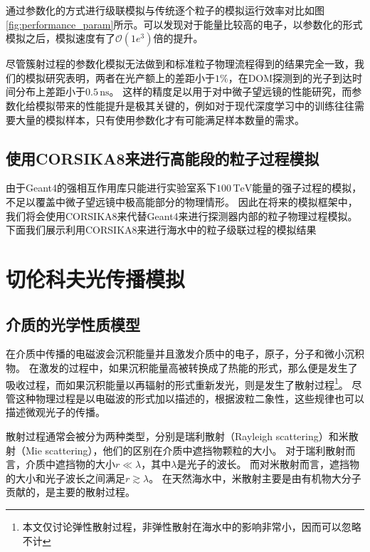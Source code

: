 通过参数化的方式进行级联模拟与传统逐个粒子的模拟运行效率对比如图\ref{fig:performance_param}所示。可以发现对于能量比较高的电子，以参数化的形式模拟之后，模拟速度有了$\mathcal{O}(1e^3)$倍的提升。

尽管簇射过程的参数化模拟无法做到和标准粒子物理流程得到的结果完全一致，我们的模拟研究表明，两者在光产额上的差距小于$1\%$，在DOM探测到的光子到达时间分布上差距小于$0.5\,\mathrm{ns}$。
这样的精度足以用于对中微子望远镜的性能研究，而参数化给模拟带来的性能提升是极其关键的，例如对于现代深度学习中的训练往往需要大量的模拟样本，只有使用参数化才有可能满足样本数量的需求。


\subsection{使用CORSIKA8来进行高能段的粒子过程模拟}

由于\textsf{Geant4}的强相互作用库只能进行实验室系下$100\,\mathrm{TeV}$能量的强子过程的模拟，不足以覆盖中微子望远镜中极高能部分的物理情形。
因此在将来的模拟框架中，我们将会使用\textsf{CORSIKA8}来代替\textsf{Geant4}来进行探测器内部的粒子物理过程模拟。
下面我们展示利用\textsf{CORSIKA8}来进行海水中的粒子级联过程的模拟结果


\section{切伦科夫光传播模拟}

\subsection{介质的光学性质模型}
\label{subsec:optical_model}

在介质中传播的电磁波会沉积能量并且激发介质中的电子，原子，分子和微小沉积物\cite{book_for_optical:1998}。
在激发的过程中，如果沉积能量高被转换成了热能的形式，那么便是发生了吸收过程，而如果沉积能量以再辐射的形式重新发光，则是发生了散射过程\footnote{本文仅讨论弹性散射过程，非弹性散射在海水中的影响非常小，因而可以忽略不计\cite{inelastic_scattering:2003}}。
尽管这种物理过程是以电磁波的形式加以描述的，根据波粒二象性，这些规律也可以描述微观光子的传播。

散射过程通常会被分为两种类型，分别是瑞利散射（Rayleigh scattering）和米散射（Mie scattering），他们的区别在介质中遮挡物颗粒的大小。
对于瑞利散射而言，介质中遮挡物的大小$r \ll \lambda$，其中$\lambda$是光子的波长。
而对米散射而言，遮挡物的大小和光子波长之间满足$r \gtrsim \lambda$。
在天然海水中，米散射主要是由有机物大分子贡献的，是主要的散射过程\cite{OP_ANTARES:2004, OP_Baikal:2012}。

